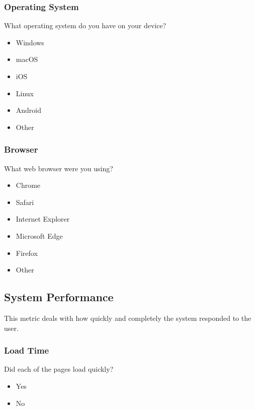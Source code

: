 \subsubsection{Operating System}
\label{subsubsec:operatingsystem}

What operating system do you have on your device?

\begin{itemize}
	\item Windows
	\item macOS
	\item iOS
	\item Linux
	\item Android
	\item Other
\end{itemize}

\subsubsection{Browser}
\label{subsubsec:browser}

What web browser were you using?

\begin{itemize}
	\item Chrome
	\item Safari
	\item Internet Explorer
	\item Microsoft Edge
	\item Firefox
	\item Other
\end{itemize}

\subsection{System Performance}
\label{subsec:systemperformance}

This metric deals with how quickly and completely the system responded to the user.

\subsubsection{Load Time}
\label{subsubsec:loadtime}

Did each of the pages load quickly?

\begin{itemize}
	\item Yes
	\item No
\end{itemize}

